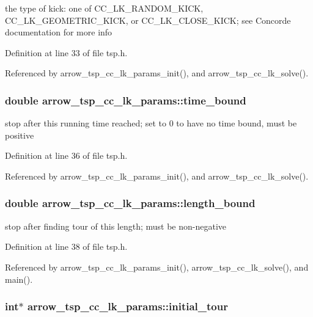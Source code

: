 the type of kick: one of CC\_\-LK\_\-RANDOM\_\-KICK, CC\_\-LK\_\-GEOMETRIC\_\-KICK, or CC\_\-LK\_\-CLOSE\_\-KICK; see Concorde documentation for more info 

Definition at line 33 of file tsp.h.

Referenced by arrow\_\-tsp\_\-cc\_\-lk\_\-params\_\-init(), and arrow\_\-tsp\_\-cc\_\-lk\_\-solve().\hypertarget{structarrow__tsp__cc__lk__params_d4a71865c09d0624395d5a71b46bf8d5}{
\subsubsection{\setlength{\rightskip}{0pt plus 5cm}double {\bf arrow\_\-tsp\_\-cc\_\-lk\_\-params::time\_\-bound}}}
\label{structarrow__tsp__cc__lk__params_d4a71865c09d0624395d5a71b46bf8d5}


stop after this running time reached; set to 0 to have no time bound, must be positive 

Definition at line 36 of file tsp.h.

Referenced by arrow\_\-tsp\_\-cc\_\-lk\_\-params\_\-init(), and arrow\_\-tsp\_\-cc\_\-lk\_\-solve().\hypertarget{structarrow__tsp__cc__lk__params_47292f99c63b9db5bad901b5aa5e42a1}{
\subsubsection{\setlength{\rightskip}{0pt plus 5cm}double {\bf arrow\_\-tsp\_\-cc\_\-lk\_\-params::length\_\-bound}}}
\label{structarrow__tsp__cc__lk__params_47292f99c63b9db5bad901b5aa5e42a1}


stop after finding tour of this length; must be non-negative 

Definition at line 38 of file tsp.h.

Referenced by arrow\_\-tsp\_\-cc\_\-lk\_\-params\_\-init(), arrow\_\-tsp\_\-cc\_\-lk\_\-solve(), and main().\hypertarget{structarrow__tsp__cc__lk__params_1093ecf5b1b8f5d198740bbaad77d4a2}{
\subsubsection{\setlength{\rightskip}{0pt plus 5cm}int$\ast$ {\bf arrow\_\-tsp\_\-cc\_\-lk\_\-params::initial\_\-tour}}}
\label{structarrow__tsp__cc__lk__params_1093ecf5b1b8f5d198740bbaad77d4a2}


